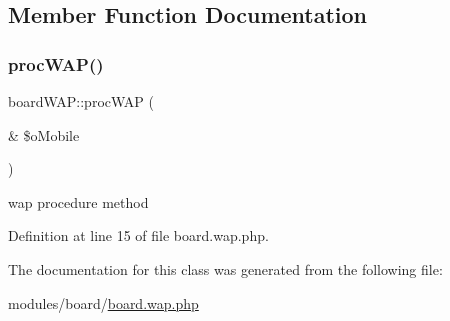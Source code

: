 \subsection{Member Function Documentation}
\hypertarget{classboardWAP_a64fd2fe05d7bb01d701f07e763f54a4b}{}\label{classboardWAP_a64fd2fe05d7bb01d701f07e763f54a4b} 
\subsubsection{\texorpdfstring{proc\+W\+A\+P()}{procWAP()}}
{\footnotesize\ttfamily board\+W\+A\+P\+::proc\+W\+AP (\begin{DoxyParamCaption}\item[{\&}]{\$o\+Mobile }\end{DoxyParamCaption})}



wap procedure method 



Definition at line 15 of file board.\+wap.\+php.



The documentation for this class was generated from the following file\+:\begin{DoxyCompactItemize}
\item 
modules/board/\hyperlink{board_8wap_8php}{board.\+wap.\+php}\end{DoxyCompactItemize}
